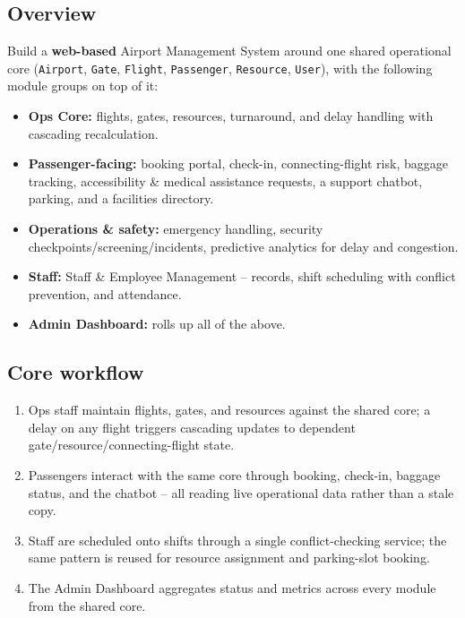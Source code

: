 \documentclass[11pt,a4paper]{article}
\begin{document}
\subsection{Overview}
Build a \textbf{web-based} Airport Management System around one
shared operational core (\texttt{Airport}, \texttt{Gate},
\texttt{Flight}, \texttt{Passenger}, \texttt{Resource}, \texttt{User}),
with the following module groups on top of it:
\begin{itemize}[leftmargin=0.7cm]
    \item \textbf{Ops Core:} flights, gates, resources, turnaround,
      and delay handling with cascading recalculation.
    \item \textbf{Passenger-facing:} booking portal, check-in,
      connecting-flight risk, baggage tracking, accessibility \&
      medical assistance requests, a support chatbot, parking, and
      a facilities directory.
    \item \textbf{Operations \& safety:} emergency handling, security
      checkpoints/screening/incidents, predictive analytics for delay
      and congestion.
    \item \textbf{Staff:} Staff \& Employee Management -- records,
      shift scheduling with conflict prevention, and attendance.
    \item \textbf{Admin Dashboard:} rolls up all of the above.
\end{itemize}

\subsection{Core workflow}
\begin{enumerate}[leftmargin=0.7cm]
    \item Ops staff maintain flights, gates, and resources against the
      shared core; a delay on any flight triggers cascading updates
      to dependent gate/resource/connecting-flight state.
    \item Passengers interact with the same core through booking,
      check-in, baggage status, and the chatbot -- all reading live
      operational data rather than a stale copy.
    \item Staff are scheduled onto shifts through a single
      conflict-checking service; the same pattern is reused for
      resource assignment and parking-slot booking.
    \item The Admin Dashboard aggregates status and metrics across
      every module from the shared core.
\end{enumerate}
\end{document}

